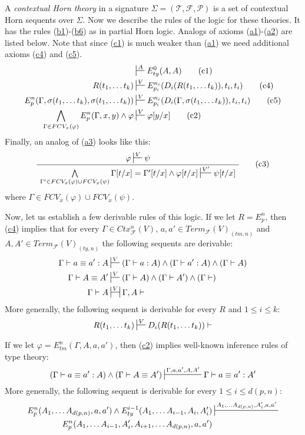 \documentclass[reqno]{amsart}
\newcommand{\axtag}[1]{\label{ax:#1} \tag{#1}}
\newcommand{\axref}[1]{(\hyperref[ax:#1]{#1})}
\theoremstyle{definition}
\theoremstyle{remark}
\numberwithin{figure}{section}
\begin{document}
A \emph{contextual Horn theory} in a signature $\Sigma = (\mathcal{T}, \mathcal{F}, \mathcal{P})$ is a set of contextual Horn sequents over $\Sigma$.
Now we describe the rules of the logic for these theories.
It has the rules \axref{b1}-\axref{b6} as in partial Horn logic.
Analogs of axioms \axref{a1}-\axref{a2} are listed below.
Note that since \axref{c1} is much weaker than \axref{a1} we need additional axioms \axref{c4} and \axref{c5}.
\begin{align*}
& \sststile{}{A} E^0_{ty}(A,A) \axtag{c1} \\
R(t_1, \ldots t_k) & \sststile{}{V} E^{n_i}_{p_i}(D_i(R(t_1, \ldots t_k)), t_i, t_i) \axtag{c4} \\
E^n_p(\Gamma, \sigma(t_1, \ldots t_k), \sigma(t_1, \ldots t_k)) & \sststile{}{V} E^{n_i}_{p_i}(D_i(\Gamma, \sigma(t_1, \ldots t_k)), t_i, t_i) \axtag{c5} \\
\bigwedge\limits_{\Gamma \in FCV_x(\varphi)} E^n_p(\Gamma, x, y) \land \varphi & \sststile{}{V} \varphi[y/x] \axtag{c2}
\end{align*}
Finally, an analog of \axref{a3} looks like this:
\begin{equation}
\AxiomC{$\varphi \sststile{}{V} \psi$}
\UnaryInfC{$\bigwedge\limits_{\Gamma' \in FCV_x(\varphi) \cup FCV_x(\psi)} \Gamma[t/x] = \Gamma'[t/x] \land \varphi[t/x] \sststile{}{V'} \psi[t/x]$}
\DisplayProof
\axtag{c3}
\end{equation}
where $\Gamma \in FCV_x(\varphi) \cup FCV_x(\psi)$.

Now, let us establish a few derivable rules of this logic.
If we let $R = E^n_p$, then \axref{c4} implies that for every $\Gamma \in Ctx^n_\mathcal{F}(V)$, $a,a' \in Term_\mathcal{F}(V)_{(tm,n)}$ and $A,A' \in Term_\mathcal{F}(V)_{(ty,n)}$ the following sequents are derivable:
\begin{align*}
\Gamma \vdash a \equiv a' : A & \sststile{}{V} (\Gamma \vdash a : A) \land (\Gamma \vdash a' : A) \land (\Gamma \vdash A) \\
\Gamma \vdash A \equiv A' & \sststile{}{V} (\Gamma \vdash A) \land (\Gamma \vdash A') \land (\Gamma \vdash) \\
\Gamma \vdash A & \ssststile{}{V} \Gamma, A \vdash
\end{align*}
More generally, the following sequent is derivable for every $R$ and $1 \leq i \leq k$:
\[ R(t_1, \ldots t_k) \sststile{}{V} D_i(R(t_1, \ldots t_k)) \vdash \]

If we let $\varphi = E^n_{tm}(\Gamma, A, a, a')$, then \axref{c2} implies well-known inference rules of type theory:
\[ (\Gamma \vdash a \equiv a' : A) \land (\Gamma \vdash A \equiv A') \sststile{}{\Gamma, a, a', A, A'} \Gamma \vdash a \equiv a' : A' \]
More generally, the following sequent is derivable for every $1 \leq i \leq d(p,n)$:
\begin{align*}
E^n_p(A_1, \ldots A_{d(p,n)}, a, a') \land E^{i-1}_{ty}(A_1, \ldots A_{i-1}, A_i, A_i') & \sststile{}{A_1, \ldots A_{d(p,n)}, A_i', a, a'} \\
E^n_p(A_1, \ldots A_{i-1}, A_i', A_{i+1}, \ldots A_{d(p,n)}, a, a') &
\end{align*}
\end{document}
